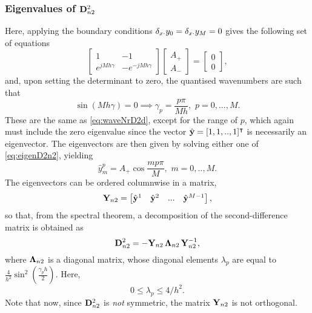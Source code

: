 \subsubsection{Eigenvalues of ${\bf D}^2_{n2}$}


Here, applying the boundary conditions $\delta_{x\cdot} y_0 = \delta_{x\cdot} y_M = 0$ gives the following set of equations
\begin{equation}\label{eq:eigenD2n2}
\begin{bmatrix}
1 & -1 \\
e^{jMh\gamma} & -e^{-jMh\gamma}
\end{bmatrix}
\begin{bmatrix}
A_+ \\
A_-
\end{bmatrix}=
\begin{bmatrix}
0 \\
0
\end{bmatrix},
\end{equation}
and, upon setting the determinant to zero, the quantised wavenumbers are such that
\begin{equation}\label{eq:EigenvaluesD2n2}
\sin ({Mh\gamma}) = 0  \implies  \gamma_p = \frac{p \pi}{M h}, \,\, p = 0,...,M.
\end{equation}
These are the same as \eqref{eq:waveNrD2d}, except for the range of $p$, which again must include the zero eigenvalue since the vector $\hat {\bf y}=[1,1,..,1]^\intercal$ is necessarily an eigenvector. The eigenvectors are then given by solving either one of \eqref{eq:eigenD2n2}, yielding
\begin{equation}
\hat y^p_m=A_+\cos\frac{m p \pi}{M}, \,\, m = 0,..,M.
\end{equation}
The eigenvectors can be ordered columnwise in a matrix,
\begin{equation}
{\bf Y}_{n2} = \begin{bmatrix}\hat {\bf y}^1 & \hat{\bf y}^2 & ... & \hat{\bf y}^{M-1}\end{bmatrix},
\end{equation}
so that, from the spectral theorem, a decomposition of the second-difference matrix is obtained as
\begin{equation}\label{eq:DecompD2n2}
{\bf D}^{2}_{n2} = -{\bf Y}_{n2} \, {\bf \Lambda}_{n2} \, {\bf Y}^{-1}_{n2},
\end{equation}
where ${{\bf \Lambda}_{n2}}$ is a diagonal matrix, whose diagonal elements $\lambda_p$ are equal to $\frac{4}{h^2}\sin^2 \left( \frac{\gamma_p h}{2}\right)$. Here, 
\begin{equation}\label{eq:BndLambdaD2n2}
0 \leq \lambda_p \leq 4/h^2.
\end{equation}
Note that now, since ${\bf D}^2_{n2}$ is \emph{not} symmetric, the matrix ${\bf Y}_{n2}$ is not orthogonal. 







